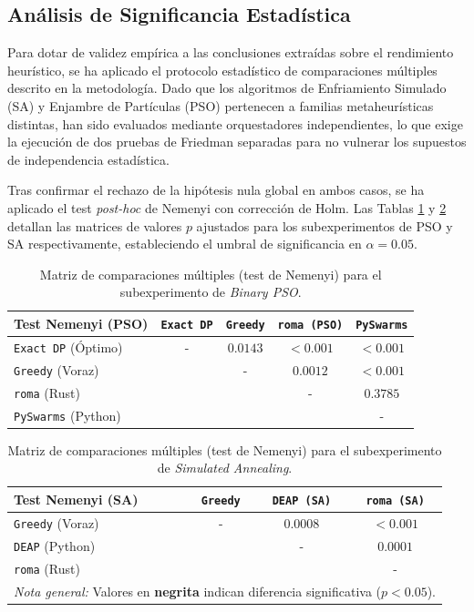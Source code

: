 \documentclass[12pt,a4paper,twoside,openright]{book}
\begin{document}
\subsection{Análisis de Significancia Estadística}
    Para dotar de validez empírica a las conclusiones extraídas sobre el rendimiento heurístico, se ha aplicado el protocolo estadístico de comparaciones múltiples descrito en la metodología. Dado que los algoritmos de Enfriamiento Simulado (SA) y Enjambre de Partículas (PSO) pertenecen a familias metaheurísticas distintas, han sido evaluados mediante orquestadores independientes, lo que exige la ejecución de dos pruebas de Friedman separadas para no vulnerar los supuestos de independencia estadística. 

    Tras confirmar el rechazo de la hipótesis nula global en ambos casos, se ha aplicado el test \textit{post-hoc} de Nemenyi con corrección de Holm. Las Tablas \ref{tab:nemenyi_knapsack_pso} y \ref{tab:nemenyi_knapsack_sa} detallan las matrices de valores $p$ ajustados para los subexperimentos de PSO y SA respectivamente, estableciendo el umbral de significancia en $\alpha = 0.05$.

\begin{table}[htbp]
\centering
\small
\setlength{\tabcolsep}{4pt}
\begin{tabular}{l cccc}
\toprule
\textbf{Test Nemenyi (PSO)} & \texttt{Exact DP} & \texttt{Greedy} & \texttt{roma (PSO)} & \texttt{PySwarms} \\
\midrule
\texttt{Exact DP} (Óptimo)    & - & $\mathbf{0.0143}$ & $\mathbf{< 0.001}$ & $\mathbf{< 0.001}$ \\
\texttt{Greedy} (Voraz)       & & - & $\mathbf{0.0012}$ & $\mathbf{< 0.001}$ \\
\texttt{roma} (Rust)         & & & - & $0.3785$ \\
\texttt{PySwarms} (Python)    & & & & - \\
\bottomrule
\end{tabular}
\caption{Matriz de comparaciones múltiples (test de Nemenyi) para el subexperimento de \textit{Binary PSO}.}
\label{tab:nemenyi_knapsack_pso}
\end{table}

\begin{table}[htbp]
\centering
\small
\setlength{\tabcolsep}{4pt}
\begin{tabular}{l ccc}
\toprule
\textbf{Test Nemenyi (SA)} & \texttt{Greedy} & \texttt{DEAP (SA)} & \texttt{roma (SA)} \\
\midrule
\texttt{Greedy} (Voraz)       & - & $\mathbf{0.0008}$ & $\mathbf{< 0.001}$ \\
\texttt{DEAP} (Python)        & & - & $\mathbf{0.0001}$ \\
\texttt{roma} (Rust)         & & & - \\
\bottomrule
\multicolumn{4}{l}{\scriptsize \textit{Nota general:} Valores en \textbf{negrita} indican diferencia significativa ($p < 0.05$).}
\end{tabular}
\caption{Matriz de comparaciones múltiples (test de Nemenyi) para el subexperimento de \textit{Simulated Annealing}.}
\label{tab:nemenyi_knapsack_sa}
\end{table}
\end{document}
